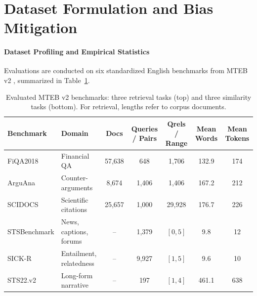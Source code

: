 \section{Dataset Formulation and Bias Mitigation}
\label{sec:datasets}

\paragraph{Dataset Profiling and Empirical Statistics}
Evaluations are conducted on six standardized English benchmarks from MTEB v2 \citep{muennighoff2023mteb}, summarized in Table~\ref{tab:dataset_statistics}.

\begin{table}[t]
\centering
\small
\caption{Evaluated MTEB v2 benchmarks: three retrieval tasks (top) and three similarity tasks (bottom). For retrieval, lengths refer to corpus documents.}
\label{tab:dataset_statistics}
\setlength{\tabcolsep}{5pt}
\begin{tabular}{llccccc}
\toprule
\textbf{Benchmark} & \textbf{Domain} & \textbf{Docs} & \textbf{Queries / Pairs} & \textbf{Qrels / Range} & \textbf{Mean Words} & \textbf{Mean Tokens} \\
\midrule
FiQA2018 & Financial QA & 57,638 & 648 & 1,706 & 132.9 & 174 \\
ArguAna & Counter-arguments & 8,674 & 1,406 & 1,406 & 167.2 & 212 \\
SCIDOCS & Scientific citations & 25,657 & 1,000 & 29,928 & 176.7 & 226 \\
\midrule
STSBenchmark & News, captions, forums & -- & 1,379 & $[0, 5]$ & 9.8 & 12 \\
SICK-R & Entailment, relatedness & -- & 9,927 & $[1, 5]$ & 9.6 & 10 \\
STS22.v2 & Long-form narrative & -- & 197 & $[1, 4]$ & 461.1 & 638 \\
\bottomrule
\end{tabular}
\end{table}

